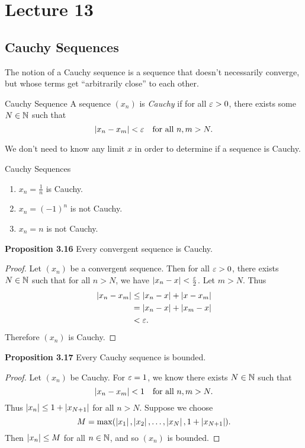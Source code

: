 \documentclass[class=article, crop=false]{standalone}
\begin{document}
  \section{Lecture 13}
  \subsection{Cauchy Sequences}
  The notion of a Cauchy sequence is a sequence that doesn't necessarily converge, but whose terms get ``arbitrarily close'' to each other.
  \begin{definition}{Cauchy Sequence}
    A sequence $(x_n)$ is \emph{Cauchy} if for all $\varepsilon > 0$, there exists some $N\in\mathbb{N}$ such that
    \[
      \left\lvert x_n - x_m \right\rvert < \varepsilon\quad \text{for all }n,m > N.
    \]
  \end{definition}
  \begin{note}{}
    We don't need to know any limit $x$ in order to determine if a sequence is Cauchy.
  \end{note}
  \begin{example}{Cauchy Sequences}
    \begin{enumerate}[label=\arabic*)]
      \item $x_n = \frac{1}{n}$ is Cauchy.
      \item $x_n = (-1)^n$ is not Cauchy.
      \item $x_n = n$ is not Cauchy.
    \end{enumerate}
  \end{example}
  \textbf{Proposition 3.16} Every convergent sequence is Cauchy.
  \begin{proof}
    Let $(x_n)$ be a convergent sequence. Then for all $\varepsilon > 0$, there exists $N\in\mathbb{N}$ such that for all $n > N$, we have $\left\lvert x_n - x \right\rvert < \frac{\varepsilon}{2}$. Let $m > N$. Thus
    \begin{align*}
      \left\lvert x_n - x_m \right\rvert &\leq \left\lvert x_n - x \right\rvert + \left\lvert x - x_m \right\rvert \\
                      &= \left\lvert x_n - x \right\rvert + \left\lvert x_m - x \right\rvert \\
                      &< \varepsilon.
    \end{align*}
    Therefore $(x_n)$ is Cauchy.
  \end{proof}
  \textbf{Proposition 3.17} Every Cauchy sequence is bounded.
  \begin{proof}
    Let $(x_n)$ be Cauchy. For $\varepsilon = 1$, we know there exists $N\in\mathbb{N}$ such that
    \[
      \left\lvert x_n - x_m \right\rvert < 1\quad \text{for all }n, m > N.
    \]
    Thus $\left\lvert x_n \right\rvert\leq 1 + \left\lvert x_{N + 1} \right\rvert$ for all $n > N$. Suppose we choose
    \[
      M = \max(\left\lvert x_1 \right\rvert, \left\lvert x_2 \right\rvert,\dotsc,\left\lvert x_N \right\rvert, 1 + \left\lvert x_{N + 1} \right\rvert).
    \]
    Then $\left\lvert x_n \right\rvert\leq M$ for all $n\in\mathbb{N}$, and so $(x_n)$ is bounded.
  \end{proof}
\end{document}
